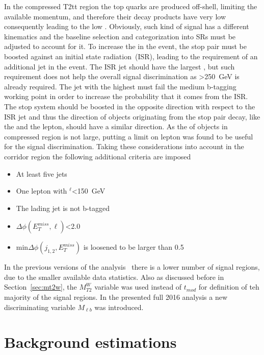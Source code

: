 In the compressed T2tt region the top quarks are produced off-shell, limiting the available momentum,  and therefore their decay products have very low \pt consequently leading to the low \MET. Obviously, such kind of signal has a different kinematics and the baseline selection and categorization into SRs must be adjusted to account for it. To increase the \MET in the event, the stop pair must be boosted against an initial state radiation~(ISR), leading to the requirement of  an additional jet in the event. The ISR jet should have the largest \pt, but such requirement does not help the overall signal discrimination as \MET>250~GeV is already required. The jet with the highest \pt must fail the medium b-tagging working point in order to increase the probability that it comes from the ISR. The stop system should be boosted in the opposite direction with respect to the ISR jet and thus the direction of objects originating from the stop pair decay, like the \MET and the lepton, should have a similar direction. As the \pt of objects in compressed region is not large, putting a limit on lepton \pt was found to be useful for the signal discrimination. Taking these considerations into account in the corridor region the following additional criteria are imposed

\begin{itemize}
\item At least five jets
\item One lepton with \pt$^{\ell}$<150~GeV
\item The lading jet is not b-tagged
\item $\Delta \phi(E_{T}^{miss}, \ell)$<2.0 
\item min$\Delta \phi (j_{1,2}, E_{T}^{miss})$ is loosened to be larger than  0.5
\end{itemize}

In the previous versions of the analysis~\cite{Sirunyan:2016jpr, CMS:2016vew} there is a lower number of signal regions, due to the smaller available data statistics. Also as discussed before in Section~\ref{sec:mt2w}, the $M_{T2}^{W}$ variable was used instead of $t_{mod}$ for definition of teh majority of the signal regions. In the presented full 2016 analysis a new discriminating variable $M_{\ell b}$ was introduced. %


\section{Background estimations~\label{sec:estimations}}

